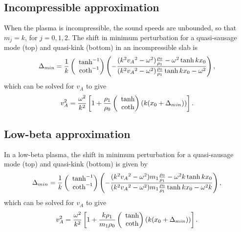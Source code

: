 \documentclass[namedreferences]{solarphysics}
\numberwithin{equation}{section}
\begin{document}
\begin{article}
\subsection{Incompressible approximation}
When the plasma is incompressible, the sound speeds are unbounded, so that $m_j = k$, for $j = 0, 1, 2$. The shift in minimum perturbation for a quasi-sausage mode (top) and quasi-kink (bottom) in an incompressible slab is
\begin{equation}
\Delta_{min} = \frac{1}{k}\left(\hspace{-0.07in}\begin{matrix} &\tanh^{-1} \\ &\coth^{-1} \end{matrix}\right)\left(-\frac{(k^2{v_A}^2-\omega^2)\frac{\rho_0}{\rho_1} - \omega^2\tanh{kx_0}}{(k^2{v_A}^2-\omega^2)\frac{\rho_0}{\rho_1}\tanh{kx_0} - \omega^2}\right),
\end{equation}
which can be solved for $v_A$ to give
\begin{equation}
v_A^2 = \frac{\omega^2}{k^2}\left[1 + \frac{\rho_1}{\rho_0}\left(\hspace{-0.07in}\begin{matrix} &\tanh \\ &\coth \end{matrix}\right)(k(x_0 + \Delta_{min}))\right].
\end{equation}


\subsection{Low-beta approximation}
In a low-beta plasma, the shift in minimum perturbation for a quasi-sausage mode (top) and quasi-kink (bottom) is given by
\begin{equation}
\Delta_{min} = \frac{1}{k}\left(\hspace{-0.07in}\begin{matrix} &\tanh^{-1} \\ &\coth^{-1} \end{matrix}\right)\left(-\frac{(k^2{v_A}^2-\omega^2)m_1\frac{\rho_0}{\rho_1} - \omega^2k\tanh{kx_0}}{(k^2{v_A}^2-\omega^2)m_1\frac{\rho_0}{\rho_1}\tanh{kx_0} - \omega^2k}\right),
\end{equation}
which can be solved for $v_A$ to give
\begin{equation}
v_A^2 = \frac{\omega^2}{k^2}\left[1 + \frac{k\rho_1}{m_1\rho_0}\left(\hspace{-0.07in}\begin{matrix} &\tanh \\ &\coth \end{matrix}\right)(k(x_0 + \Delta_{min}))\right].
\end{equation}


\end{article}
\end{document}

